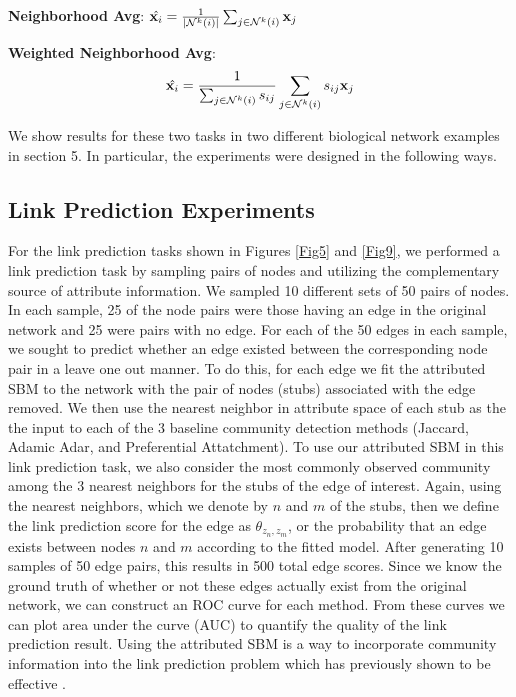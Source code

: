 \documentclass[10pt,journal,compsoc]{IEEEtran}
\begin{document}
{\bf Neighborhood Avg}: $\hat{{\bf x}_{i}}= \frac{1}{|\mathcal{N}^{k}(i)|}\sum_{j \in \mathcal{N}^{k}(i)} {\bf x}_{j}$

{\bf Weighted Neighborhood Avg}: \[\hat{{\bf x}_{i}}=\frac{1}{\sum_{j \in \mathcal{N}^{k}(i)}s_{ij}}\sum_{j \in \mathcal{N}^{k}(i)}s_{ij}{\bf x}_{j}\]

We show results for these two tasks in two different biological network examples in section 5. In particular, the experiments were designed in the following ways.

\subsection{Link Prediction Experiments}
For the link prediction tasks shown in Figures \ref{Fig5} and \ref{Fig9}, we performed a link prediction task by sampling pairs of nodes and utilizing the complementary source of attribute information. We sampled 10 different sets of 50 pairs of nodes. In each sample, 25 of the node pairs were those having an edge in the original network and 25 were pairs with no edge. For each of the 50 edges in each sample, we sought to predict whether an edge existed between the corresponding node pair in a leave one out manner. To do this, for each edge we fit the attributed SBM to the network with the pair of nodes (stubs) associated with the edge removed. We then use the nearest neighbor in attribute space of each stub as the the input to each of the 3 baseline community detection methods (Jaccard, Adamic Adar, and Preferential Attatchment). To use our attributed SBM in this link prediction task, we also consider the most commonly observed community among the 3 nearest neighbors for the stubs of the edge of interest. Again, using the nearest neighbors, which we denote by $n$ and $m$ of the stubs, then we define the link prediction score for the edge as $\theta_{z_{n},z_{m}}$, or the probability that an edge exists between nodes $n$ and $m$ according to the fitted model. After generating 10 samples of 50 edge pairs, this results in 500 total edge scores. Since we know the ground truth of whether or not these edges actually exist from the original network, we can construct an ROC curve for each method. From these curves we can plot area under the curve (AUC) to quantify the quality of the link prediction result. Using the attributed SBM is a way to incorporate community information into the link prediction problem which has previously shown to be effective \cite{linkComm}.
\end{document}

